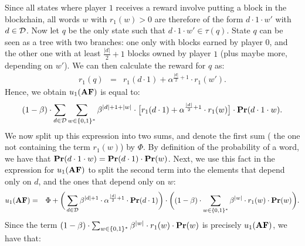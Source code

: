 Since all states where player $1$ receives a reward involve putting a block in the blockchain, all words 
$w$ with $r_1(w) > 0$ are therefore of the form $d\cdot 1\cdot w'$ with $d \in \mathcal{D}$. Now let $q$ be the only state such that  $d\cdot 1\cdot w' \in \tau(q)$.
State $q$ can be seen as a tree with two branches: one only with blocks earned by player $0$, and the other one 
with at least ${\frac{|d|}{2}+1}$ blocks owned by player $1$ (plus maybe more, depending on $w'$). 
We can then calculate the reward for $q$ as: 
\begin{eqnarray*}
r_1(q) & = & r_1(d \cdot 1) + \alpha^{\frac{|d|}{2}+1}\cdot r_1(w').
\end{eqnarray*}
Hence, we obtain $u_1(\text{\rm {\bf AF}})$ is equal to:
\begin{eqnarray*}
 (1-\beta)\cdot\sum_{d\in \mathcal{D}}  \sum_{w\in \{0,1\}^*}\beta^{|d|+1+|w|}\cdot \big[r_1(d\cdot 1) + \alpha^{\frac{|d|}{2}+1}\cdot r_1(w)\big] \cdot \mathbf{Pr}(d\cdot 1 \cdot w).
\end{eqnarray*}
%
%
We now split up this expression into two sums, and denote the first sum (\ie
the one not containing the term $r_1(w)$) by $\Phi$.
By definition of the probability of a word, we have that $\mathbf{Pr}(d\cdot 1\cdot w) = \mathbf{Pr}(d\cdot 1)\cdot \mathbf{Pr}(w)$. 
Next, we use this fact in the expression for $u_1(\text{\rm {\bf AF}})$ to split the second term into the elements that depend only on $d$, and the ones that depend only on $w$:
%
\begin{eqnarray*}
 u_1(\text{\rm {\bf AF}}) & = & \Phi  + 
  \bigg(\sum_{d\in \mathcal{D}} \beta^{|d|+1}\cdot  \alpha^{\frac{|d|}{2}+1}\cdot \mathbf{Pr}(d\cdot 1)\bigg) \cdot 
 \bigg((1-\beta)\cdot\sum_{w\in \{0,1\}^*} \beta^{|w|} \cdot r_1(w)  \cdot \mathbf{Pr}(w)\bigg).
\end{eqnarray*}
%
Since the term $(1-\beta)\cdot\sum_{w\in \{0,1\}^*} \beta^{|w|} \cdot r_1(w)  \cdot \mathbf{Pr}(w)$ is precisely $u_1(\text{\rm {\bf AF}})$, we have that:
